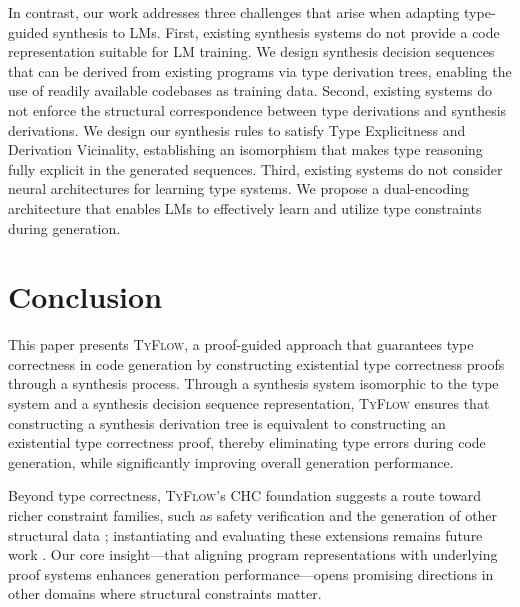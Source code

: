 \documentclass[manuscript,screen]{acmart}
\newcommand{\toolname}[1]{\textsc{#1}}
\newcommand{\mainname}{\toolname{TyFlow}\xspace}
\begin{document}
In contrast, our work addresses three challenges that arise when adapting type-guided synthesis to LMs.
First, existing synthesis systems do not provide a code representation suitable for LM training. We design synthesis decision sequences that can be derived from existing programs via type derivation trees, enabling the use of readily available codebases as training data.
Second, existing systems do not enforce the structural correspondence between type derivations and synthesis derivations. We design our synthesis rules to satisfy Type Explicitness and Derivation Vicinality, establishing an isomorphism that makes type reasoning fully explicit in the generated sequences.
Third, existing systems do not consider neural architectures for learning type systems. We propose a dual-encoding architecture that enables LMs to effectively learn and utilize type constraints during generation.

\section{Conclusion \label{sec:conclusion}}
This paper presents \mainname, a proof-guided approach that guarantees type correctness in code generation by constructing existential type correctness proofs through a synthesis process. Through a synthesis system isomorphic to the type system and a synthesis decision sequence representation, \mainname ensures that constructing a synthesis derivation tree is equivalent to constructing an existential type correctness proof, thereby eliminating type errors during code generation, while significantly improving overall generation performance. 

Beyond type correctness, \mainname's    {\color{revblue}CHC foundation suggests a route toward richer constraint families, such as } safety verification and the generation of other structural data {\color{revblue}; instantiating and evaluating these extensions remains future work} . Our core insight---that aligning program representations with underlying proof systems enhances   generation performance---opens promising directions    {\color{revblue}in } other domains where structural constraints matter.

\end{document}
